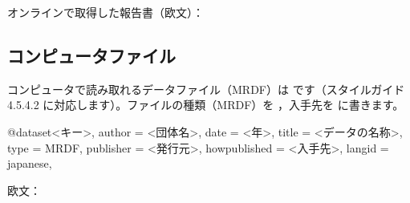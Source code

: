 
オンラインで取得した報告書（欧文）：


\subsection{コンピュータファイル}\label{sec:dataset}
コンピュータで読み取れるデータファイル（MRDF）は  です（スタイルガイド 4.5.4.2 に対応します）。ファイルの種類（MRDF）を ，入手先を  に書きます。

\begin{bibtemplate}
@dataset{<キー>,
  author       = {{<団体名>}},
  date         = {<年>},
  title        = {<データの名称>},
  type         = {MRDF},
  publisher    = {<発行元>},
  howpublished = {<入手先>},
  langid       = {japanese},
}
\end{bibtemplate}


欧文：

